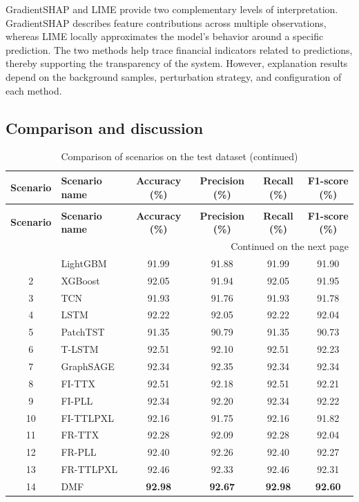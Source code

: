 \documentclass[10pt,twoside]{article}
\newcommand{\fairsmallfont}{\fontsize{9pt}{11pt}\selectfont}
\begin{document}
GradientSHAP and LIME provide two complementary levels of interpretation. GradientSHAP describes feature contributions across multiple observations, whereas LIME locally approximates the model's behavior around a specific prediction. The two methods help trace financial indicators related to predictions, thereby supporting the transparency of the system. However, explanation results depend on the background samples, perturbation strategy, and configuration of each method.

\subsection{Comparison and discussion}

\begingroup
\centering
\setlength{\tabcolsep}{4pt}
\renewcommand{\arraystretch}{1.05}
\begin{longtable}{c l c c c c}
\caption{Comparison of scenarios on the test dataset}
\label{tab:test_scenarios_comparison}\\
\hline
\textbf{Scenario} & \textbf{Scenario name} & \textbf{Accuracy (\%)} & \textbf{Precision (\%)} & \textbf{Recall (\%)} & \textbf{F1-score (\%)} \\
\hline
\endfirsthead
\caption[]{Comparison of scenarios on the test dataset (continued)}\\
\hline
\textbf{Scenario} & \textbf{Scenario name} & \textbf{Accuracy (\%)} & \textbf{Precision (\%)} & \textbf{Recall (\%)} & \textbf{F1-score (\%)} \\
\hline
\endhead
\hline
\multicolumn{6}{r}{\fairsmallfont Continued on the next page}\\
\endfoot
\hline
\endlastfoot
1  & LightGBM   & 91.99 & 91.88 & 91.99 & 91.90 \\
2  & XGBoost    & 92.05 & 91.94 & 92.05 & 91.95 \\
3  & TCN        & 91.93 & 91.76 & 91.93 & 91.78 \\
4  & LSTM       & 92.22 & 92.05 & 92.22 & 92.04 \\
5  & PatchTST   & 91.35 & 90.79 & 91.35 & 90.73 \\
6  & T-LSTM     & 92.51 & 92.10 & 92.51 & 92.23 \\
7  & GraphSAGE  & 92.34 & 92.35 & 92.34 & 92.34 \\
8  & FI-TTX     & 92.51 & 92.18 & 92.51 & 92.21 \\
9  & FI-PLL     & 92.34 & 92.20 & 92.34 & 92.22 \\
10 & FI-TTLPXL  & 92.16 & 91.75 & 92.16 & 91.82 \\
11 & FR-TTX     & 92.28 & 92.09 & 92.28 & 92.04 \\
12 & FR-PLL     & 92.40 & 92.26 & 92.40 & 92.27 \\
13 & FR-TTLPXL  & 92.46 & 92.33 & 92.46 & 92.31 \\
14 & DMF        & \textbf{92.98} & \textbf{92.67} & \textbf{92.98} & \textbf{92.60} \\
\end{longtable}
\endgroup
\end{document}

